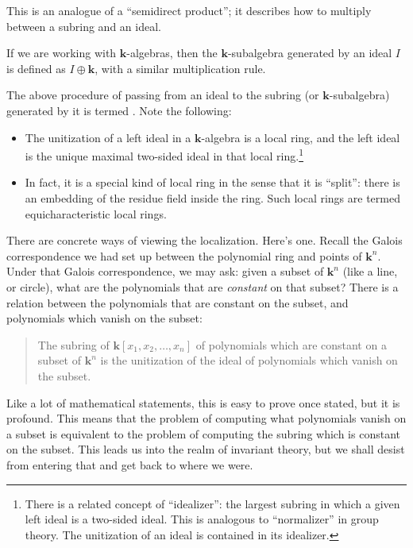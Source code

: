 \documentclass[a4paper]{amsart}
\newcommand{\field}{\mathbf{k}}
\begin{document}
This is an analogue of a ``semidirect product''; it describes how to
multiply between a subring and an ideal.

If we are working with $\field$-algebras, then the $\field$-subalgebra
generated by an ideal $I$ is defined as $I \oplus \field$, with a
similar multiplication rule.

The above procedure of passing from an ideal to the subring (or
$\field$-subalgebra) generated by it is termed
. Note the following:

\begin{itemize}

\item The unitization of a left ideal in a $\field$-algebra is a local
  ring, and the left ideal is the unique maximal two-sided ideal in
  that local ring.\footnote{There is a related concept of
    ``idealizer'': the largest subring in which a given left ideal is
    a two-sided ideal. This is analogous to ``normalizer'' in group
    theory. The unitization of an ideal is contained in its idealizer.}

\item In fact, it is a special kind of local ring in the sense that it
  is ``split'': there is an embedding of the residue field inside the
  ring. Such local rings are termed equicharacteristic local rings.

\end{itemize}

There are concrete ways of viewing the localization. Here's
one. Recall the Galois correspondence we had set up between the
polynomial ring and points of $\field^n$. Under that Galois
correspondence, we may ask: given a subset of $\field^n$ (like a line,
or circle), what are the polynomials that are {\em constant} on that
subset? There is a relation between the polynomials that are constant
on the subset, and polynomials which vanish on the subset:

\begin{quote}
  The subring of $\field[x_1,x_2,\ldots,x_n]$ of polynomials which are
  constant on a subset of $\field^n$ is the unitization of the ideal
  of polynomials which vanish on the subset.
\end{quote}

Like a lot of mathematical statements, this is easy to prove once
stated, but it is profound. This means that the problem of computing
what polynomials vanish on a subset is equivalent to the problem of
computing the subring which is constant on the subset. This leads us
into the realm of invariant theory, but we shall desist from entering
that and get back to where we were.
\end{document}
